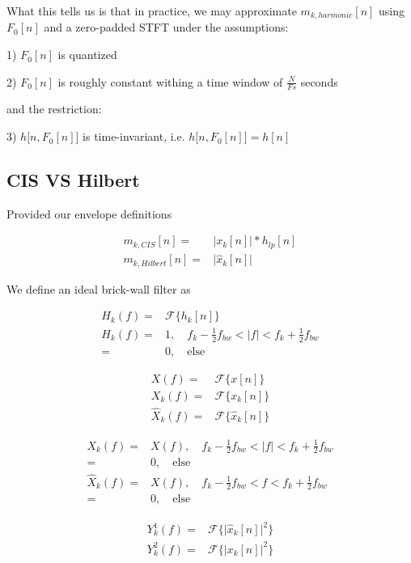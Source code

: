\documentclass [11pt, proquest,oneside] {uwthesis}[2015/03/03]
\begin{document}
What this tells us is that in practice, we may approximate $m_{k,harmonic}[n]$ using $F_0[n]$ and a zero-padded STFT under the assumptions:

1) $F_0[n]$ is quantized

2) $F_0[n]$ is roughly constant withing a time window of $\frac{N}{Fs}$ seconds

and the restriction:

3) $h\Big[n, F_0[n] \Big]$ is time-invariant, i.e. $h\Big[n, F_0[n] \Big] = h[n]$

\subsection{CIS VS Hilbert}

Provided our envelope definitions

\begin{align}
m_{k,CIS}[n] =& \Big| x_k[n] \Big| * h_{lp}[n] \nonumber \\
m_{k,Hilbert}[n] =& \Big| \widehat{x}_k[n] \Big| \nonumber
\end{align}

We define an ideal brick-wall filter as

\begin{align}
H_k(f) =& \mathcal{F}\Big\{ h_k[n]  \Big\} \\
H_k(f) =& 1, \quad f_k - \frac{1}{2} f_{bw} < |f| < f_k + \frac{1}{2} f_{bw} \\
=& 0, \quad \mathrm{else}
\end{align}

\begin{align}
X(f) =& \mathcal{F}\Big\{ x[n] \Big\} \\
X_{k}(f) =& \mathcal{F}\Big\{ x_k[n] \Big\} \\
\widehat{X}_{k}(f) =& \mathcal{F}\Big\{ \widehat{x}_k[n]  \Big\}
\end{align}

\begin{align}
X_{k}(f) =& X(f), \quad f_k - \frac{1}{2} f_{bw} < |f| < f_k + \frac{1}{2} f_{bw} \\
=& 0, \quad \mathrm{else} \\
\widehat{X}_{k}(f) =& X(f), \quad f_k - \frac{1}{2} f_{bw} < f < f_k + \frac{1}{2} f_{bw} \\
=& 0, \quad \mathrm{else}
\end{align}

\begin{align}
Y_{k}^1(f) =& \mathcal{F}\Big\{ \Big| \widehat{x}_k[n] \Big|^2  \Big\} \\
Y_{k}^2(f) =& \mathcal{F}\Big\{ \Big| x_k[n] \Big|^2  \Big\}
\end{align}
\end{document}
